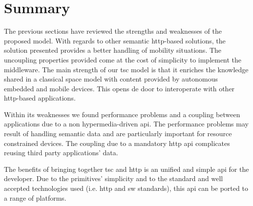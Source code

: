 \section{Summary}

The previous sections have reviewed the strengths and weaknesses of the proposed model.
With regards to other semantic \ac{http}-based solutions, the solution presented provides a better handling of mobility situations. %
The uncoupling properties provided come at the cost of simplicity to implement the middleware.
The main strength of our \ac{tsc} model is that it enriches the knowledge shared in a classical space model with content provided by autonomous embedded and mobile devices.
This opens de door to interoperate with other \ac{http}-based applications.


Within its weaknesses we found performance problems and a coupling between applications due to a non hypermedia-driven \ac{api}.
The performance problems may result of handling semantic data and are particularly important for resource constrained devices.
The coupling due to a mandatory \ac{http} \ac{api} complicates reusing third party applications' data.


The benefits of bringing together \ac{tsc} and \ac{http} is an unified and simple \ac{api} for the developer. %
Due to the primitives' simplicity and to the standard and well accepted technologies used (i.e. \ac{http} and \ac{sw} standards), this \ac{api} can be ported to a range of platforms.